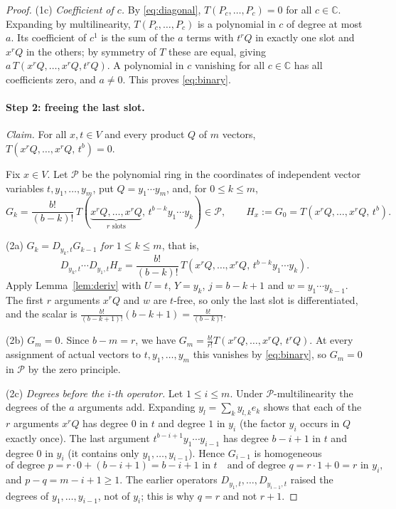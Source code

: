 \documentclass[11pt]{article}
\theoremstyle{remark}
\newcommand{\C}{\mathbb C}
\newcommand{\D}[2]{D_{#1,#2}}
\newcommand{\PP}{\mathcal P}
\begin{document}
\begin{proof}
(1c) \emph{Coefficient of $c$.} By \eqref{eq:diagonal},
$T(P_c,\dots,P_c)=0$ for all $c\in\C$. Expanding by multilinearity,
$T(P_c,\dots,P_c)$ is a polynomial in $c$ of degree at most $a$. Its
coefficient of $c^1$ is the sum of the $a$ terms with $t^rQ$ in exactly one
slot and $x^rQ$ in the others; by symmetry of $T$ these are equal, giving
$a\,T(x^rQ,\ldots,x^rQ,t^rQ)$. A polynomial in $c$ vanishing for all
$c\in\C$ has all coefficients zero, and $a\ne0$. This proves
\eqref{eq:binary}.

\paragraph{Step 2: freeing the last slot.}
\emph{Claim.} For all $x,t\in V$ and every product $Q$ of $m$ vectors,
$T(x^rQ,\ldots,x^rQ,\,t^b)=0$.

Fix $x\in V$. Let $\PP$ be the polynomial ring in the coordinates of
independent vector variables $t,y_1,\ldots,y_m$, put $Q=y_1\cdots y_m$, and,
for $0\le k\le m$,
\[
 G_k=\frac{b!}{(b-k)!}\,
 T(\underbrace{x^rQ,\ldots,x^rQ}_{r\text{ slots}},\,t^{b-k}y_1\cdots y_k)
 \in\PP,\qquad H_x:=G_0=T(x^rQ,\ldots,x^rQ,\,t^b).
\]

(2a) \emph{$G_k=\D{y_k}{t}G_{k-1}$ for $1\le k\le m$}, that is,
\begin{equation}\label{eq:first-composition}
 \D{y_k}{t}\cdots\D{y_1}{t}H_x
 =\frac{b!}{(b-k)!}\,
 T(x^rQ,\ldots,x^rQ,\,t^{b-k}y_1\cdots y_k).
\end{equation}
Apply Lemma~\ref{lem:deriv} with $U=t$, $Y=y_k$, $j=b-k+1$ and
$w=y_1\cdots y_{k-1}$. The first $r$ arguments $x^rQ$ and $w$ are $t$-free,
so only the last slot is differentiated, and the scalar is
$\frac{b!}{(b-k+1)!}(b-k+1)=\frac{b!}{(b-k)!}$.

(2b) \emph{$G_m=0$.} Since $b-m=r$, we have
$G_m=\frac{b!}{r!}T(x^rQ,\ldots,x^rQ,\,t^rQ)$. At every assignment of
actual vectors to $t,y_1,\dots,y_m$ this vanishes by \eqref{eq:binary}, so
$G_m=0$ in $\PP$ by the zero principle.

(2c) \emph{Degrees before the $i$-th operator.} Let $1\le i\le m$. Under
$\PP$-multilinearity the degrees of the $a$ arguments add. Expanding
$y_l=\sum_ky_{l,k}e_k$ shows that each of the $r$ arguments $x^rQ$ has
degree $0$ in $t$ and degree $1$ in $y_i$ (the factor $y_i$ occurs in $Q$
exactly once). The last argument $t^{b-i+1}y_1\cdots y_{i-1}$ has degree
$b-i+1$ in $t$ and degree $0$ in $y_i$ (it contains only
$y_1,\dots,y_{i-1}$). Hence $G_{i-1}$ is homogeneous
\[
 \text{of degree }p=r\cdot0+(b-i+1)=b-i+1\text{ in }t
 \quad\text{and of degree }q=r\cdot1+0=r\text{ in }y_i,
\]
and $p-q=m-i+1\ge1$. The earlier operators
$\D{y_1}{t},\dots,\D{y_{i-1}}{t}$ raised the degrees of
$y_1,\dots,y_{i-1}$, not of $y_i$; this is why $q=r$ and not $r+1$.


\end{proof}
\end{document}
